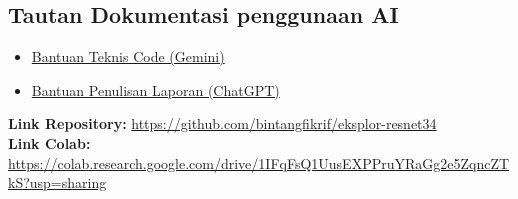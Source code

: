 \documentclass[11pt,a4paper]{article}
\begin{document}
\subsection{Tautan Dokumentasi penggunaan AI}
\begin{itemize}
    \item \href{https://g.co/gemini/share/1aa41bbbde0b}{Bantuan Teknis Code (Gemini)}
    \item \href{https://chatgpt.com/share/68dfedb6-c168-8010-89b5-86fa946694d2}{Bantuan Penulisan Laporan (ChatGPT)}
\end{itemize}



\vspace{0.5cm}
\noindent\textbf{Link Repository:} \url{https://github.com/bintangfikrif/eksplor-resnet34} \\
\textbf{Link Colab:} \url{https://colab.research.google.com/drive/1IFqFsQ1UusEXPPruYRaGg2e5ZqncZTkS?usp=sharing}
\end{document}
